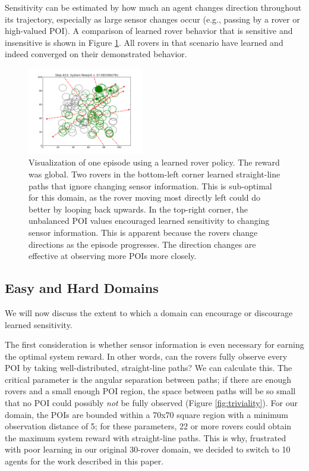 \documentclass[letterpaper, 10 pt, conference]{ieeeconf}  %
\begin{document}
Sensitivity can be estimated by how much an agent changes direction throughout its trajectory, especially as large sensor changes occur (e.g., passing by a rover or high-valued POI). A comparison of learned rover behavior that is sensitive and insensitive is shown in Figure \ref{fig:sensitivity}. All rovers in that scenario have learned and indeed converged on their demonstrated behavior. 

\begin{figure}[h!]
    \centering
    \includegraphics[width=0.45\textwidth]{GlobalMvt75Eps100POIsBaselineSensor.png}
    \caption{Visualization of one episode using a learned rover policy. The reward was global. Two rovers in the bottom-left corner learned straight-line paths that ignore changing sensor information. This is sub-optimal for this domain, as the rover moving most directly left could do better by looping back upwards. In the top-right corner, the unbalanced POI values encouraged learned sensitivity to changing sensor information. This is apparent because the rovers change directions as the episode progresses. The direction changes are effective at observing more POIs more closely. }
    \label{fig:sensitivity}
\end{figure}


\subsection{Easy and Hard Domains}
We will now discuss the extent to which a domain can encourage or discourage learned sensitivity. 

The first consideration is whether sensor information is even necessary for earning the optimal system reward. In other words, can the rovers fully observe every POI by taking well-distributed, straight-line paths? We can calculate this. The critical parameter is the angular separation between paths; if there are enough rovers and a small enough POI region, the space between paths will be so small that no POI could possibly \emph{not} be fully observed (Figure \ref{fig:triviality}). For our domain, the POIs are bounded within a 70x70 square region with a minimum observation distance of 5; for these parameters, 22 or more rovers could obtain the maximum system reward with straight-line paths. This is why, frustrated with poor learning in our original 30-rover domain, we decided to switch to 10 agents for the work described in this paper.
\end{document}
